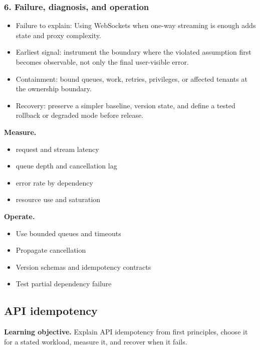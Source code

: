 \subsubsection*{6. Failure, diagnosis, and operation}
\begin{itemize}
\item Failure to explain: Using WebSockets when one-way streaming is enough adds state and proxy complexity.
\item Earliest signal: instrument the boundary where the violated assumption first becomes observable, not only the final user-visible error.
\item Containment: bound queues, work, retries, privileges, or affected tenants at the ownership boundary.
\item Recovery: preserve a simpler baseline, version state, and define a tested rollback or degraded mode before release.
\end{itemize}
\textbf{Measure.}\begin{itemize}
\item request and stream latency
\item queue depth and cancellation lag
\item error rate by dependency
\item resource use and saturation
\end{itemize}
\textbf{Operate.}\begin{itemize}
\item Use bounded queues and timeouts
\item Propagate cancellation
\item Version schemas and idempotency contracts
\item Test partial dependency failure
\end{itemize}
\subsection{API idempotency}
\textbf{Learning objective.} Explain API idempotency from first principles, choose it for a stated workload, measure it, and recover when it fails.
